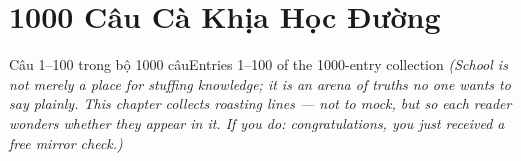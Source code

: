 \chapter{1000 Câu Cà Khịa Học Đường}

\begin{truyen}{Câu 1–100 trong bộ 1000 câu}{Entries 1–100 of the 1000-entry collection}
\textit{(School is not merely a place for stuffing knowledge; it is an arena of truths no one wants to say plainly. This chapter collects roasting lines --- not to mock, but so each reader wonders whether they appear in it. If you do: congratulations, you just received a free mirror check.)}
\end{truyen}

